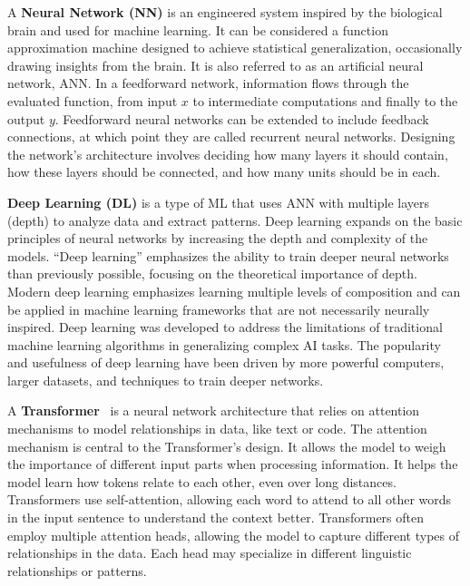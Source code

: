 A \textbf{Neural Network (NN)} is an engineered system inspired by the biological brain and used for machine learning. It can be considered a function approximation machine designed to achieve statistical generalization, occasionally drawing insights from the brain. It is also referred to as an artificial neural network, ANN. In a feedforward network, information flows through the evaluated function, from input $x$ to intermediate computations and finally to the output $y$. Feedforward neural networks can be extended to include feedback connections, at which point they are called recurrent neural networks. Designing the network's architecture involves deciding how many layers it should contain, how these layers should be connected, and how many units should be in each. \cite{goodfellowbengiocourville2016}

\textbf{Deep Learning (DL)} is a type of ML that uses ANN with multiple layers (depth) to analyze data and extract patterns. Deep learning expands on the basic principles of neural networks by increasing the depth and complexity of the models. ``Deep learning'' emphasizes the ability to train deeper neural networks than previously possible, focusing on the theoretical importance of depth. Modern deep learning emphasizes learning multiple levels of composition and can be applied in machine learning frameworks that are not necessarily neurally inspired. Deep learning was developed to address the limitations of traditional machine learning algorithms in generalizing complex AI tasks. The popularity and usefulness of deep learning have been driven by more powerful computers, larger datasets, and techniques to train deeper networks. \cite{goodfellowbengiocourville2016}

A \textbf{Transformer}~\cite{vaswani2023} is a neural network architecture that relies on attention mechanisms to model relationships in data, like text or code. The attention mechanism is central to the Transformer's design. It allows the model to weigh the importance of different input parts when processing information. It helps the model learn how tokens relate to each other, even over long distances. Transformers use self-attention, allowing each word to attend to all other words in the input sentence to understand the context better. Transformers often employ multiple attention heads, allowing the model to capture different types of relationships in the data. Each head may specialize in different linguistic relationships or patterns. \cite{jurafsky2025}

